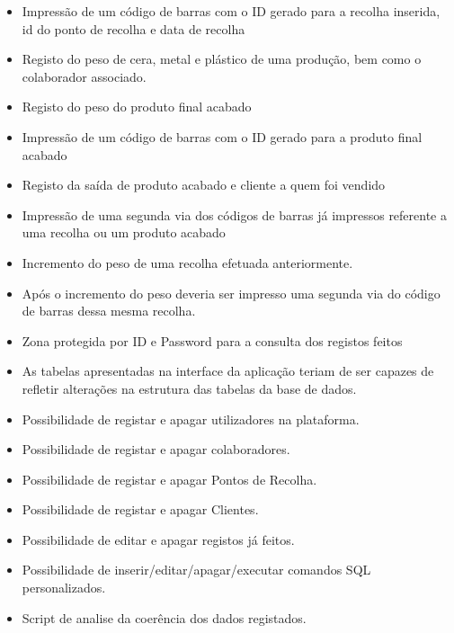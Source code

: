 \begin{itemize}
	\item Impressão de um código de barras com o ID gerado para a recolha inserida, id do ponto de recolha e data de recolha
	\item Registo do peso de cera, metal e plástico de uma produção, bem como o colaborador associado.
	\item Registo do peso do produto final acabado
	\item Impressão de um código de barras com o ID gerado para a produto final acabado
	\item Registo da saída de produto acabado e cliente a quem foi vendido
	\item Impressão de uma segunda via dos códigos de barras já impressos referente a uma recolha ou um produto acabado
	\item Incremento do peso de uma recolha efetuada anteriormente.
	\item Após o incremento do peso deveria ser impresso uma segunda via do código de barras dessa mesma recolha.
	\item Zona protegida por ID e Password para a consulta dos registos feitos
	\item As tabelas apresentadas na interface da aplicação teriam de ser capazes de refletir alterações na estrutura das tabelas da base de dados.
	\item Possibilidade de registar e apagar utilizadores na plataforma.
	\item Possibilidade de registar e apagar colaboradores.
	\item Possibilidade de registar e apagar Pontos de Recolha.
	\item Possibilidade de registar e apagar Clientes.
	\item Possibilidade de editar e apagar registos já feitos.
	\item Possibilidade de inserir/editar/apagar/executar comandos SQL personalizados.
	\item Script de analise da coerência dos dados registados.
\end{itemize}